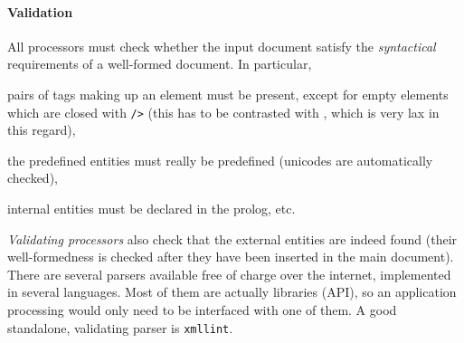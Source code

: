 \paragraph{Validation}

All \XML processors must check whether the input document satisfy the
\emph{syntactical} requirements of a well\hyp{}formed \XML document.
In particular,
\begin{itemize*}

\item pairs of tags making up an element must be present, except for
  empty elements which are closed with \texttt{/>} (this has to be
  contrasted with \HTML, which is very lax in this regard),

  \item the predefined entities must really be predefined (unicodes
    are automatically checked),

  \item internal entities must be declared in the prolog, etc.

\end{itemize*}
\emph{Validating processors} also check that the external entities are
indeed found (their well\hyp{}formedness is checked after they have
been inserted in the main document). There are several \XML parsers
available free of charge over the internet, implemented in several
languages. Most of them are actually libraries (API), so an
application processing \XML would only need to be interfaced with one
of them. A good standalone, validating parser is \texttt{xmllint}.

\mypar{\HTML}

